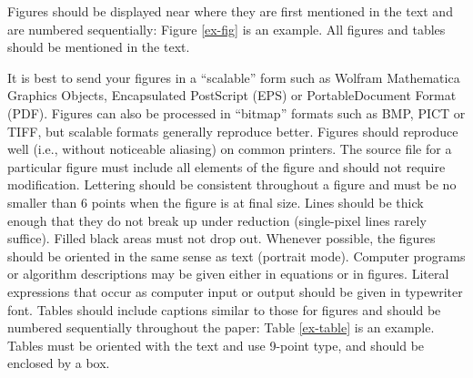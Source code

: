 \documentclass{article}
\begin{document}
Figures should be displayed near where they are first mentioned in the text and are numbered sequentially: Figure \ref{ex-fig} is an example. All figures and tables should be mentioned in the text.

It is best to send your figures in a {``}scalable{''} form such as Wolfram Mathematica Graphics Objects, Encapsulated PostScript (EPS) or PortableDocument Format (PDF). Figures can also be processed in {``}bitmap{''} formats such as BMP, PICT or TIFF, but scalable formats generally reproduce better.
Figures should reproduce well (i.e., without noticeable aliasing) on common printers. The source file for a particular figure must include all elements of the figure and should not require modification. Lettering should be consistent throughout a figure and must be no smaller than 6 points when the figure is at final size. Lines should be thick enough that they do not break up under reduction (single-pixel lines rarely suffice). Filled black areas must not drop out. Whenever possible, the figures should be oriented in the same sense as text (portrait mode). 
Computer programs or algorithm descriptions may be given either in equations or in figures. Literal expressions that occur as computer input or output should be given in typewriter font. 
Tables should include captions similar to those for figures and should be numbered sequentially throughout the paper: Table \ref{ex-table} is an example. Tables must be oriented with the text and use 9-point type, and should be enclosed by a box. 
\end{document}
